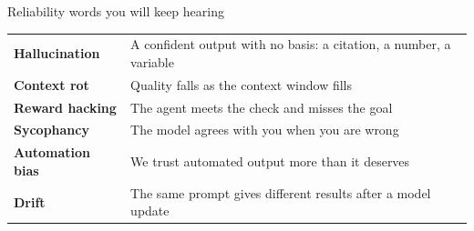 \begin{frame}{Reliability words you will keep hearing}
  \vspace{0.4em}
  \begin{center}
  \renewcommand{\arraystretch}{1.25}
  \begin{tabularx}{0.9\linewidth}{>{\bfseries\color{ink}}l X}
  \toprule
  Hallucination & A confident output with no basis: a citation, a number, a variable\\
  Context rot & Quality falls as the context window fills\\
  Reward hacking & The agent meets the check and misses the goal\\
  Sycophancy & The model agrees with you when you are wrong\\
  Automation bias & We trust automated output more than it deserves \citep{skitka_1999_automation_bias}\\
  Drift & The same prompt gives different results after a model update\\
  \bottomrule
  \end{tabularx}
  \end{center}
\end{frame}
